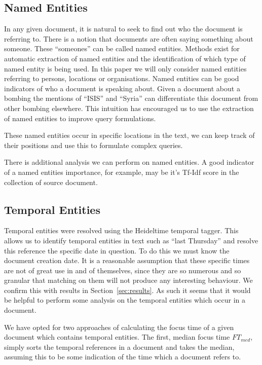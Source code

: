 \documentclass{mpaper}
\begin{document}
\subsection{Named Entities}
In any given document, it is natural to seek to find out who the document is referring to. There is a notion that documents are often saying something about someone.
These ``someones'' can be called named entities. 
Methods exist for automatic extraction of named entities and the identification of which type of named entity is being used.
In this paper we will only consider named entities referring to persons, locations or organisations.
Named entities can be good indicators of who a document is speaking about.
Given a document about a bombing the mentions of ``ISIS'' and ``Syria'' can differentiate this document from other bombing elsewhere.
This intuition has encouraged us to use the extraction of named entities to improve query formulations.

These named entities occur in specific locations in the text, we can keep track of their positions and use this to formulate complex queries.

There is additional analysis we can perform on named entities.
A good indicator of a named entities importance, for example, may be it's Tf-Idf score in the collection of source document.

\subsection{Temporal Entities}
Temporal entities were resolved using the Heideltime temporal tagger. This allows us to identify temporal entities in text such as ``last Thursday'' and resolve this reference the specific date in question. To do this we must know the document creation date.
It is a reasonable assumption that these specific times are not of great use in and of themselves, since they are so numerous and so granular that matching on them will not produce any interesting behaviour. We confirm this with results in Section~\ref{sec:results}. As such it seems that it would be helpful to perform some analysis on the temporal entities which occur in a document.

We have opted for two approaches of calculating the focus time of a given document which contains temporal entities.
The first, median focus time $FT_{med}$, simply sorts the temporal references in a document and takes the median, assuming this to be some indication of the time which a document refers to.
\end{document}
